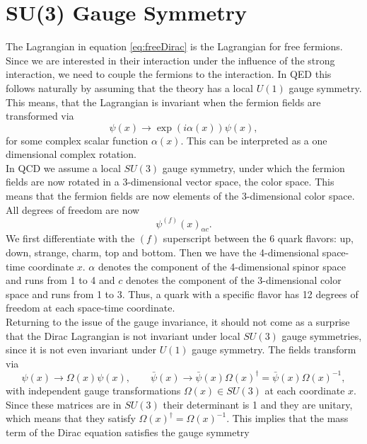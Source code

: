 \section{SU(3) Gauge Symmetry}
The Lagrangian in equation \eqref{eq:freeDirac} is the Lagrangian for free fermions. Since we are interested in their interaction under the influence of the strong interaction, we need to couple the fermions to the interaction. In QED this follows naturally by assuming that the theory has a local $U(1)$ gauge symmetry. This means, that the Lagrangian is invariant when the fermion fields are transformed via
\begin{equation}
    \psi(x)\rightarrow \exp(i\alpha(x))\psi(x),
\end{equation}
for some complex scalar function $\alpha(x)$. This can be interpreted as a one dimensional complex rotation.\\
In QCD we assume a local $SU(3)$ gauge symmetry, under which the fermion fields are now rotated in a 3-dimensional vector space, the color space. This means that the fermion fields are now elements of the 3-dimensional color space. All degrees of freedom are now
\begin{equation}
    \psi^{(f)}(x)_{\alpha c}.
\end{equation}
We first differentiate with the $(f)$ superscript between the 6 quark flavors: up, down, strange, charm, top and bottom. Then we have the 4-dimensional space-time coordinate $x$. $\alpha$ denotes the component of the 4-dimensional spinor space and runs from 1 to 4 and $c$ denotes the component of the 3-dimensional color space and runs from 1 to 3. Thus, a quark with a specific flavor has 12 degrees of freedom at each space-time coordinate.\\
Returning to the issue of the gauge invariance, it should not come as a surprise that the Dirac Lagrangian is not invariant under local $SU(3)$ gauge symmetries, since it is not even invariant under $U(1)$ gauge symmetry. The fields transform via
\begin{equation}
    \psi(x)\rightarrow\Omega(x)\psi(x),\qquad \bar\psi(x)\rightarrow\bar\psi(x)\Omega(x)^\dagger=\bar\psi(x)\Omega(x)^{-1},
\end{equation}
with independent gauge transformations $\Omega(x)\in SU(3)$ at each coordinate $x$. Since these matrices are in $SU(3)$ their determinant is 1 and they are unitary, which means that they satisfy $\Omega(x)^\dagger=\Omega(x)^{-1}$. This implies that the mass term of the Dirac equation satisfies the gauge symmetry
